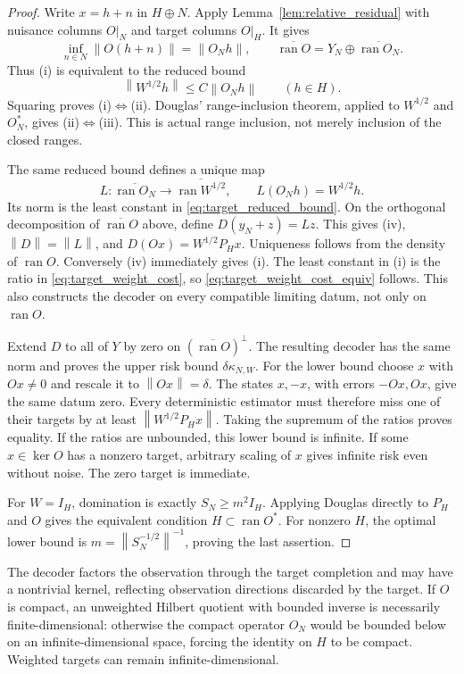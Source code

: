 \documentclass[11pt,a4paper]{amsart}
\numberwithin{equation}{section}
\theoremstyle{definition}
\theoremstyle{remark}
\DeclareMathOperator{\ran}{ran}
\newcommand{\norm}[1]{\left\lVert#1\right\rVert}
\begin{document}
\begin{proof}
Write $x=h+n$ in $H\oplus N$. Apply Lemma~\ref{lem:relative_residual} with nuisance columns $O|_N$ and target columns $O|_H$. It gives
\[
 \inf_{n\in N}\norm{O(h+n)}=\norm{O_Nh},\qquad
 \overline{\ran O}=Y_N\oplus\overline{\ran O_N}.
\]
Thus (i) is equivalent to the reduced bound
\begin{equation}\label{eq:target_reduced_bound}
 \norm{W^{1/2}h}\le C\norm{O_Nh}\qquad(h\in H).
\end{equation}
Squaring proves (i)$\Leftrightarrow$(ii). Douglas' range-inclusion theorem, applied to $W^{1/2}$ and $O_N^*$, gives (ii)$\Leftrightarrow$(iii). This is actual range inclusion, not merely inclusion of the closed ranges.

The same reduced bound defines a unique map
\[
 L:\overline{\ran O_N}\longrightarrow\overline{\ran W^{1/2}},
 \qquad L(O_Nh)=W^{1/2}h.
\]
Its norm is the least constant in \eqref{eq:target_reduced_bound}. On the orthogonal decomposition of $\overline{\ran O}$ above, define $D(y_N+z)=Lz$. This gives (iv), $\norm D=\norm L$, and $D(Ox)=W^{1/2}P_Hx$. Uniqueness follows from the density of $\ran O$. Conversely (iv) immediately gives (i). The least constant in (i) is the ratio in \eqref{eq:target_weight_cost}, so \eqref{eq:target_weight_cost_equiv} follows. This also constructs the decoder on every compatible limiting datum, not only on $\ran O$.

Extend $D$ to all of $Y$ by zero on $(\overline{\ran O})^\perp$. The resulting decoder has the same norm and proves the upper risk bound $\delta\kappa_{N,W}$. For the lower bound choose $x$ with $Ox\ne0$ and rescale it to $\norm{Ox}=\delta$. The states $x,-x$, with errors $-Ox,Ox$, give the same datum zero. Every deterministic estimator must therefore miss one of their targets by at least $\norm{W^{1/2}P_Hx}$. Taking the supremum of the ratios proves equality. If the ratios are unbounded, this lower bound is infinite. If some $x\in\ker O$ has a nonzero target, arbitrary scaling of $x$ gives infinite risk even without noise. The zero target is immediate.

For $W=I_H$, domination is exactly $S_N\ge m^2I_H$. Applying Douglas directly to $P_H$ and $O$ gives the equivalent condition $H\subset\ran O^*$. For nonzero $H$, the optimal lower bound is $m=\norm{S_N^{-1/2}}^{-1}$, proving the last assertion.
\end{proof}

The decoder factors the observation through the target completion and may have a nontrivial kernel, reflecting observation directions discarded by the target. If $O$ is compact, an unweighted Hilbert quotient with bounded inverse is necessarily finite-dimensional: otherwise the compact operator $O_N$ would be bounded below on an infinite-dimensional space, forcing the identity on $H$ to be compact. Weighted targets can remain infinite-dimensional.
\end{document}
